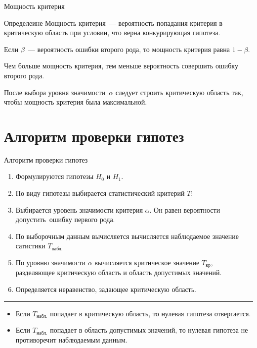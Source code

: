 \documentclass[unicode,11pt,notheorems,xcolor=table]{beamer}
\begin{document}
\begin{frame}{Мощность критерия}{}

    \begin{block}{Определеине}
        \alert{Мощность критерия}~---  вероятность попадания критерия в критическую область при условии, что верна конкурирующая гипотеза.
    \end{block}

    \vfill 
    Если $\beta$~--- вероятность ошибки второго рода, то мощность критерия равна $1-\beta$. 
    
    
    \vfill 
    Чем больше мощность критерия, тем меньше вероятность совершить ошибку второго рода. 
    
    \vfill 
    \begin{block}{}
        После выбора уровня значимости~$\alpha$ следует строить критическую область так, чтобы мощность критерия была максимальной.
    \end{block}
\end{frame}

{
\section{Алгоритм проверки гипотез}
\begin{frame}{Алгоритм проверки гипотез}{}
\begin{enumerate}
    \item Формулируются гипотезы $H_0$ и $H_1$.
    \item По виду гипотезы выбирается статистический критерий $T$;
    \item Выбирается уровень значимости критерия $\alpha$. Он равен вероятности допустить ошибку первого рода.
    \item По выборочным данным вычисляется вычисляется наблюдаемое значение сатистики $T_\text{набл.}$
    \item По уровню значимости $\alpha$ вычисляется критическое значение $T_\text{кр}$, разделяющее критическую область и область допустимых значений.
    \item Определяется неравенство, задающее критическую область.
\end{enumerate}

\medskip
\hrule
\medskip

\begin{itemize}
    \item Если $T_\text{набл.}$ попадает в  критическую область, то нулевая гипотеза отвергается.
    \item  Если $T_\text{набл.}$ попадает в область допустимых значений, то нулевая гипотеза не противоречит наблюдаемым данным.
\end{itemize}    
\end{frame}
}
\end{document}
